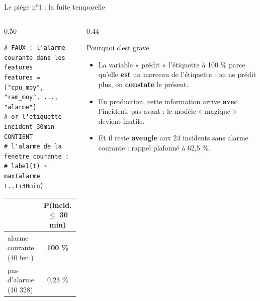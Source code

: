 \begin{frame}[fragile]{Le piège n°1 : la fuite temporelle}
\footnotesize%
\begin{columns}[t]
\setlength{\columnsep}{2pt}
\begin{column}{0.50\textwidth}
\begin{lstlisting}
# FAUX : l'alarme courante dans les features
features = ["cpu_moy", "ram_moy", ..., "alarme"]
# or l'etiquette incident_30min CONTIENT
# l'alarme de la fenetre courante :
# label(t) = max(alarme t..t+30min)
\end{lstlisting}
\begin{wbox}
\scriptsize
\begin{tabular}{@{}lc@{}}
\toprule
 & P(incid. $\le$ 30 min)\\
\midrule
alarme courante (40 fen.) & \textbf{100 \%}\\
pas d'alarme (10 328) & 0,23 \%\\
\bottomrule
\end{tabular}
\end{wbox}
\end{column}
\begin{column}{0.44\textwidth}
\begin{block}{Pourquoi c'est grave}
\begin{itemize}
\item La variable « prédit » l'étiquette à 100 \% parce qu'elle
\textbf{est} un morceau de l'étiquette : on ne prédit plus, on
\textbf{constate} le présent.
\item En production, cette information arrive \textbf{avec} l'incident,
pas avant : le modèle « magique » devient inutile.
\item Et il reste \textbf{aveugle} aux 24 incidents sans alarme
courante : rappel plafonné à 62,5 \%.
\end{itemize}
\end{block}
\end{column}
\end{columns}
\end{frame}

